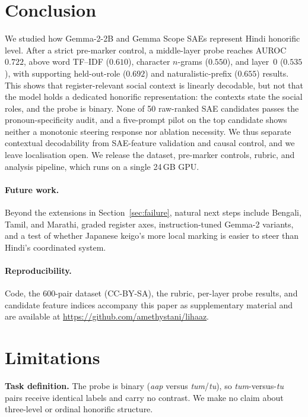 \documentclass[11pt]{article}
\newcommand{\aap}{\textit{aap}}
\newcommand{\tum}{\textit{tum}}
\newcommand{\tu}{\textit{tu}}
\begin{document}
\section{Conclusion}
\label{sec:conclusion}

We studied how Gemma-2-2B and Gemma Scope SAEs represent Hindi honorific level.
After a strict pre-marker control, a middle-layer probe reaches AUROC $0.722$,
above word TF--IDF ($0.610$), character $n$-grams ($0.550$), and layer~0
($0.535$), with supporting held-out-role ($0.692$) and naturalistic-prefix
($0.655$) results. This shows that register-relevant social context is linearly
decodable, but not that the model holds a dedicated honorific representation:
the contexts state the social roles, and the probe is binary. None of 50
raw-ranked SAE candidates passes the pronoun-specificity audit, and a
five-prompt pilot on the top candidate shows neither a monotonic steering
response nor ablation necessity. We thus separate contextual decodability from
SAE-feature validation and causal control, and we leave localisation open. We
release the dataset, pre-marker controls, rubric, and analysis pipeline, which
runs on a single 24\,GB GPU.

\paragraph{Future work.}
Beyond the extensions in Section~\ref{sec:failure}, natural next steps include
Bengali, Tamil, and Marathi, graded register axes, instruction-tuned Gemma-2
variants, and a test of whether Japanese keigo's more local marking is easier to
steer than Hindi's coordinated system.

\paragraph{Reproducibility.}
Code, the 600-pair dataset (CC-BY-SA), the rubric, per-layer probe results, and
candidate feature indices accompany this paper as supplementary material and
are available at \url{https://github.com/amethystani/lihaaz}.


\section*{Limitations}
\textbf{Task definition.} The probe is binary (\aap{} versus \tum{}/\tu{}), so
\tum{}-versus-\tu{} pairs receive identical labels and carry no contrast. We
make no claim about three-level or ordinal honorific structure.
\end{document}
